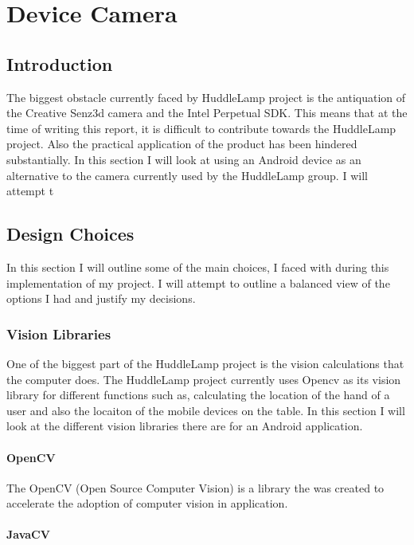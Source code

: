 \chapter{Device Camera}

\label{ch:devcamera}
\section{Introduction}

The biggest obstacle currently faced by HuddleLamp project is the antiquation of the Creative Senz3d camera and the Intel Perpetual SDK. This means that at the time of writing this report, it is difficult to contribute towards the HuddleLamp project. Also the practical application of the product has been hindered substantially. In this section I will look at using an Android device as an alternative to the camera currently used by the HuddleLamp group. I will attempt t


\section{Design Choices} \label{design_choice_android_camera}
In this section I will outline some of the main choices, I faced with during this implementation of my project. I will attempt to outline a balanced view of the options I had and justify my decisions.

\subsection{Vision Libraries}
One of the biggest part of the HuddleLamp project is the vision calculations that the computer does. The HuddleLamp project currently uses Opencv as its vision library for different functions such as, calculating the location of the hand of a user and also the locaiton of the mobile devices on the table. In this section I will look at the different vision libraries there are for an Android application.

\subsubsection{OpenCV}
The OpenCV (Open Source Computer Vision) is a library the was created to accelerate the adoption of computer vision in application. 
\subsubsection{JavaCV}

